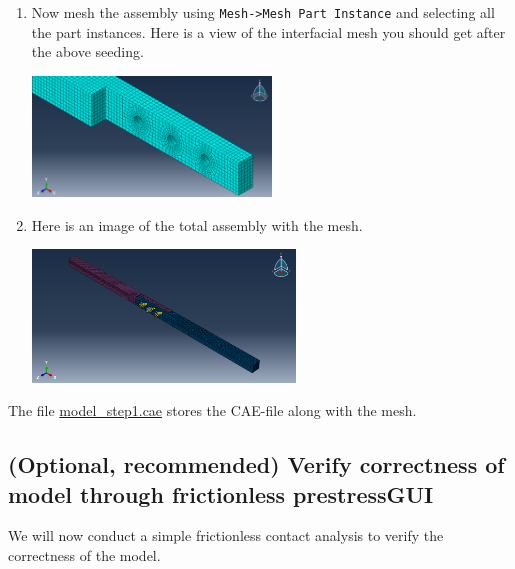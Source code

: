 \documentclass[11pt]{article}
\begin{document}
\begin{enumerate}
\begin{center}
\end{center}
\item Now mesh the assembly using \texttt{Mesh->Mesh Part Instance} and selecting all the part instances.
Here is a view of the interfacial mesh you should get after the above seeding.
\begin{center}
\includegraphics[width=0.5\textwidth]{./figs/mesh.png}
\end{center}
\item Here is an image of the total assembly with the mesh.
\begin{center}
\includegraphics[width=0.55\textwidth]{./figs/fullmesh.png}
\end{center}
\end{enumerate}

The file \href{https://github.com/Nidish96/Abaqus4Joints/blob/main/assets/assembly/model\_step1.cae}{model\_step1.cae} stores the CAE-file along with the mesh.
\subsection{(Optional, recommended) Verify correctness of model through frictionless prestress\hfill{}\textsc{GUI}}
\label{sec:orgdd23dea}
We will now conduct a simple frictionless contact analysis to verify the correctness of the model.
\end{document}
